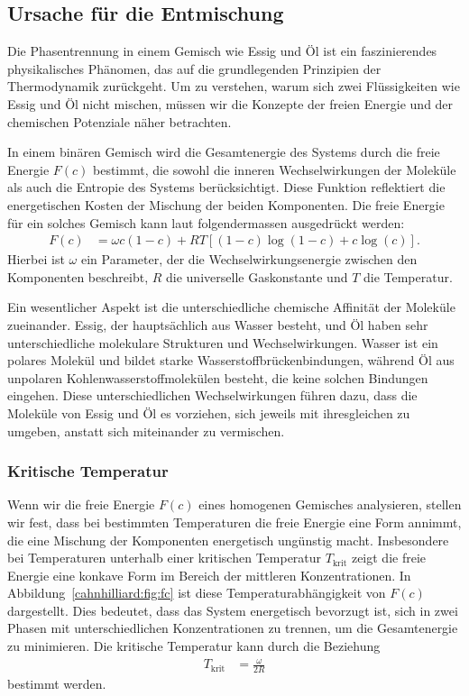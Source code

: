 \subsection{Ursache für die Entmischung}

Die Phasentrennung in einem Gemisch wie Essig und Öl
ist ein faszinierendes physikalisches Phänomen,
das auf die grundlegenden Prinzipien der Thermodynamik zurückgeht.
Um zu verstehen,
warum sich zwei Flüssigkeiten wie Essig und Öl nicht mischen,
müssen wir die Konzepte der freien Energie und
der chemischen Potenziale näher betrachten.

In einem binären Gemisch wird die Gesamtenergie des Systems
durch die freie Energie $F(c)$ bestimmt,
die sowohl die inneren Wechselwirkungen der Moleküle
als auch die Entropie des Systems berücksichtigt.
Diese Funktion reflektiert die energetischen Kosten der Mischung der beiden Komponenten.
Die freie Energie für ein solches Gemisch kann laut \cite{cahnhilliard:deriv}
folgendermassen ausgedrückt werden:
\begin{align*}
F(c)
&=
\omega c (1 - c) + R T \left[ (1-c) \log(1-c) + c \log(c) \right].
\end{align*}
Hierbei ist $\omega$ ein Parameter,
der die Wechselwirkungsenergie zwischen den Komponenten beschreibt,
$R$ die universelle Gaskonstante und
%
$T$ die Temperatur.
%

Ein wesentlicher Aspekt ist die unterschiedliche chemische Affinität
der Moleküle zueinander.
Essig,
der hauptsächlich aus Wasser besteht,
und Öl haben sehr unterschiedliche molekulare Strukturen und Wechselwirkungen.
Wasser ist ein polares Molekül und bildet starke Wasserstoffbrückenbindungen,
%
%
während Öl aus unpolaren Kohlenwasserstoffmolekülen besteht,
%
die keine solchen Bindungen eingehen.
Diese unterschiedlichen Wechselwirkungen führen dazu,
dass die Moleküle von Essig und Öl es vorziehen,
sich jeweils mit ihresgleichen zu umgeben,
anstatt sich miteinander zu vermischen.

\subsubsection{Kritische Temperatur}
%
Wenn wir die freie Energie $F(c)$ eines homogenen Gemisches analysieren,
stellen wir fest,
dass bei bestimmten Temperaturen die freie Energie eine Form annimmt,
die eine Mischung der Komponenten energetisch ungünstig macht.
Insbesondere bei Temperaturen unterhalb einer kritischen Temperatur $T_\text{krit}$
zeigt die freie Energie eine konkave Form im Bereich der mittleren Konzentrationen.
In Abbildung~\ref{cahnhilliard:fig:fc}
ist diese Temperaturabhängigkeit von $F(c)$ dargestellt.
Dies bedeutet,
dass das System energetisch bevorzugt ist,
sich in zwei Phasen mit unterschiedlichen Konzentrationen zu trennen,
um die Gesamtenergie zu minimieren.
Die kritische Temperatur kann durch die Beziehung
\begin{align*}
T_\text{krit}
&=
\frac{\omega}{2 R}
\end{align*}
bestimmt werden.

